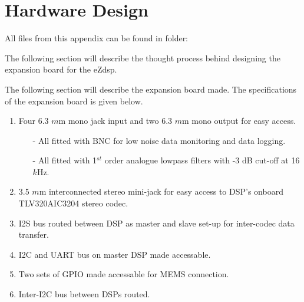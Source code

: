 \section{Hardware Design}


All files from this appendix can be found in folder: \\

The following section will describe the thought process behind designing the expansion board for the eZdsp. 

The following section will describe the expansion board made. The specifications of the expansion board is given below.%





\begin{enumerate}
	\item Four 6.3 $m$m mono jack input and two 6.3 $m$m mono output for easy access.
	\begin{itemize}
		\item[-] All fitted with BNC for low noise data monitoring and data logging.
		\item[-] All fitted with 1$^{st}$ order analogue lowpass filters with -3 dB cut-off at 16 $k$Hz.
	\end{itemize}
	\item 3.5 $m$m interconnected stereo mini-jack for easy access to DSP's onboard TLV320AIC3204 stereo codec.
	\item I2S bus routed between DSP as master and slave set-up for inter-codec data transfer.
	\item I2C and UART bus on master DSP made accessable.
	\item Two sets of GPIO made accessable for MEMS connection.
	\item Inter-I2C bus between DSPs routed. 
\end{enumerate}

